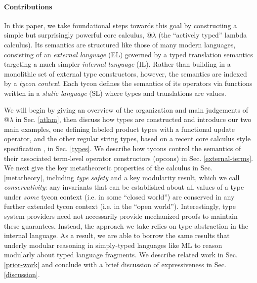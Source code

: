 \documentclass[10pt,preprint]{sigplanconf}
\begin{document}
\paragraph{Contributions} In this paper, we take foundational steps towards this goal by  constructing a simple but surprisingly powerful core calculus, @$\lambda$ (the ``actively typed'' lambda calculus). %
Its semantics are structured like those of many modern languages, consisting of an \emph{external language} (EL) governed by a {typed translation semantics} targeting a much simpler \emph{internal language} (IL). 
Rather than building in a monolithic set of external type constructors, however, the  semantics are indexed by a \emph{tycon context}. Each tycon defines the semantics of its operators via functions written in a \emph{static language} (SL) where types and translations are values. %

We will begin by giving an overview of the organization  and main judgements of @$\lambda$ in Sec. \ref{atlam}, then discuss how types are constructed and introduce our two main examples, one defining labeled product types with a functional update operator, and the other regular string types, based on a recent core calculus style specification \cite{sanitation-psp14}, in Sec. \ref{types}. We describe how tycons control the semantics of their associated term-level operator constructors (opcons) in Sec. \ref{external-terms}.  We next give the key metatheoretic properties of the calculus in Sec. \ref{metatheory}, including \emph{type safety} and a key modularity result, which we call  \emph{conservativity}: any invariants that can be established about all values of a type under \emph{some} tycon context (i.e. in some  ``closed world'') are conserved in any further extended tycon context (i.e. in the ``open world''). Interestingly, type system providers need not necessarily provide mechanized proofs to maintain these guarantees. Instead, the approach we take relies on type abstraction in the internal language. As a result, we are able to borrow the same results that underly modular reasoning in simply-typed languages like ML to reason modularly about typed language fragments. We describe  related work in Sec. \ref{prior-work} and conclude with a brief discussion of expressiveness in Sec. \ref{discussion}.
\end{document}
